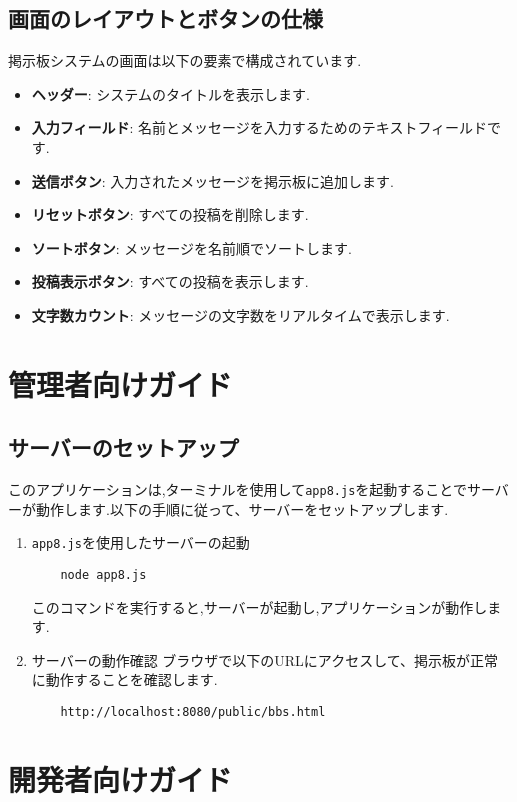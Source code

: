 \documentclass[uplatex,dvipdfmx]{jsarticle}
\begin{document}
\subsection{画面のレイアウトとボタンの仕様}
掲示板システムの画面は以下の要素で構成されています.
\begin{itemize}
    \item \textbf{ヘッダー}: システムのタイトルを表示します.
    \item \textbf{入力フィールド}: 名前とメッセージを入力するためのテキストフィールドです.
    \item \textbf{送信ボタン}: 入力されたメッセージを掲示板に追加します.
    \item \textbf{リセットボタン}: すべての投稿を削除します.
    \item \textbf{ソートボタン}: メッセージを名前順でソートします.
    \item \textbf{投稿表示ボタン}: すべての投稿を表示します.
    \item \textbf{文字数カウント}: メッセージの文字数をリアルタイムで表示します.
\end{itemize}

\section{管理者向けガイド}
\subsection{サーバーのセットアップ}
このアプリケーションは,ターミナルを使用して\texttt{app8.js}を起動することでサーバーが動作します.以下の手順に従って、サーバーをセットアップします.
\begin{enumerate}
    \item \texttt{app8.js}を使用したサーバーの起動
    \begin{verbatim}
    node app8.js
    \end{verbatim}
    このコマンドを実行すると,サーバーが起動し,アプリケーションが動作します.

    \item サーバーの動作確認
    ブラウザで以下のURLにアクセスして、掲示板が正常に動作することを確認します.
    \begin{verbatim}
    http://localhost:8080/public/bbs.html
    \end{verbatim}
\end{enumerate}

\section{開発者向けガイド}
\end{document}
